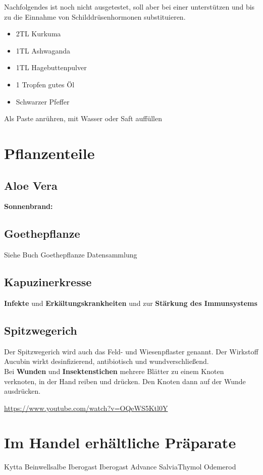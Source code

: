 Nachfolgendes ist noch nicht ausgetestet, soll aber bei einer  unterstützen und bis zu die Einnahme von Schilddrüsenhormonen substituieren.

\begin{itemize}
	\item 2TL Kurkuma
	\item 1TL Ashwaganda
	\item 1TL Hagebuttenpulver
	\item 1 Tropfen gutes Öl
	\item Schwarzer Pfeffer
\end{itemize}

Als Paste anrühren, mit Wasser oder Saft auffüllen



\section{Pflanzenteile}


\subsection{Aloe Vera}

\textbf{Sonnenbrand:}


\subsection{Goethepflanze}

Siehe Buch Goethepflanze Datensammlung



\subsection{Kapuzinerkresse}

\textbf{Infekte} und \textbf{Erkältungskrankheiten} und zur \textbf{Stärkung des Immunsystems}

  






\subsection{Spitzwegerich}

Der Spitzwegerich wird auch das Feld- und Wiesenpflaster genannt. Der Wirkstoff Aucubin wirkt desinfizierend, antibiotisch und wundverschließend.\\
Bei \textbf{Wunden} und \textbf{Insektenstichen} mehrere Blätter zu einem Knoten verknoten, in der Hand reiben und drücken. Den Knoten dann auf der Wunde ausdrücken. 

 

\cite{swrhandwerkskunst}  

\url{https://www.youtube.com/watch?v=OQeWS5Ktl0Y}



\section{Im Handel erhältliche Präparate}

Kytta Beinwellsalbe
Iberogast
Iberogast Advance
SalviaThymol
Odemerod

